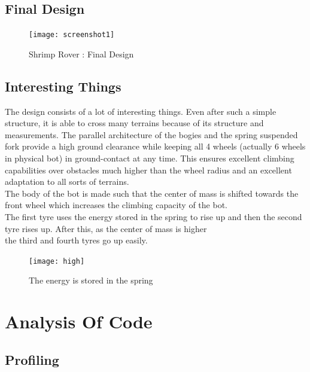 \documentclass[english, 11pt]{article}
\begin{document}
\subsection{Final Design}
\begin{figure}
	\begin{center}
		\texttt{[image: screenshot1]}
	\end{center}
	\caption{Shrimp Rover : Final Design}
\end{figure}

 

\subsection{Interesting Things}
The design consists of a lot of interesting things. Even after such a simple structure, it is able to cross many terrains because of its structure and measurements. 
The parallel architecture of the bogies and the spring suspended fork provide a high ground clearance while
keeping all 4 wheels (actually 6 wheels in physical bot) in ground-contact at any time. This ensures excellent climbing capabilities over
obstacles much higher than the wheel radius and an excellent adaptation to all sorts of terrains.\cite{ieeepaper} \\
The body of the bot is made such that the center of mass is shifted towards the front wheel which increases the climbing capacity of the bot.\\
The first tyre uses the energy stored in the spring to rise up and then the second tyre rises up. After this, as the center of mass is higher\\
 the third and fourth tyres go up easily.\cite{book1} \\
 \begin{figure}
	\begin{center}
		\texttt{[image: high]}
	\end{center}
	\caption{The energy is stored in the spring}
\end{figure}
 
\section{Analysis Of Code}

\subsection{Profiling}
\end{document}
